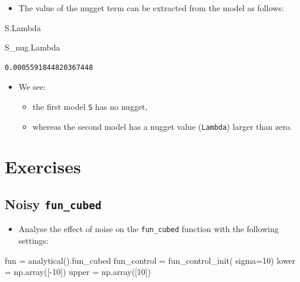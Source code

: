 \documentclass[
  letterpaper,
  DIV=11,
  numbers=noendperiod]{scrreprt}
\newenvironment{Shaded}{\begin{snugshade}}{\end{snugshade}}
\newcommand{\DecValTok}[1]{\textcolor[rgb]{0.68,0.00,0.00}{#1}}
\newcommand{\NormalTok}[1]{\textcolor[rgb]{0.00,0.23,0.31}{#1}}
\newcommand{\OperatorTok}[1]{\textcolor[rgb]{0.37,0.37,0.37}{#1}}
\providecommand{\tightlist}{%
  \setlength{\itemsep}{0pt}\setlength{\parskip}{0pt}}\usepackage{longtable,booktabs,array}
\begin{document}
\begin{itemize}
\tightlist
\item
  The value of the nugget term can be extracted from the model as
  follows:
\end{itemize}

\begin{Shaded}
\begin{Highlighting}[]
\NormalTok{S.Lambda}
\end{Highlighting}
\end{Shaded}

\begin{Shaded}
\begin{Highlighting}[]
\NormalTok{S\_nug.Lambda}
\end{Highlighting}
\end{Shaded}

\begin{verbatim}
0.0005591844820367448
\end{verbatim}

\begin{itemize}
\tightlist
\item
  We see:

  \begin{itemize}
  \tightlist
  \item
    the first model \texttt{S} has no nugget,
  \item
    whereas the second model has a nugget value (\texttt{Lambda}) larger
    than zero.
  \end{itemize}
\end{itemize}

\section{Exercises}\label{exercises-6}

\subsection{\texorpdfstring{Noisy
\texttt{fun\_cubed}}{Noisy fun\_cubed}}\label{noisy-fun_cubed}

\begin{itemize}
\tightlist
\item
  Analyse the effect of noise on the \texttt{fun\_cubed} function with
  the following settings:
\end{itemize}

\begin{Shaded}
\begin{Highlighting}[]
\NormalTok{fun }\OperatorTok{=}\NormalTok{ analytical().fun\_cubed}
\NormalTok{fun\_control }\OperatorTok{=}\NormalTok{ fun\_control\_init(}
\NormalTok{    sigma}\OperatorTok{=}\DecValTok{10}\NormalTok{)}
\NormalTok{lower }\OperatorTok{=}\NormalTok{ np.array([}\OperatorTok{{-}}\DecValTok{10}\NormalTok{])}
\NormalTok{upper }\OperatorTok{=}\NormalTok{ np.array([}\DecValTok{10}\NormalTok{])}
\end{Highlighting}
\end{Shaded}
\end{document}

